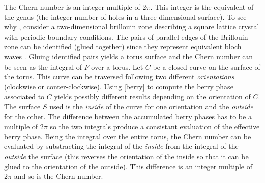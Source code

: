 The Chern number is an integer multiple of $2\pi$. This integer is the equivalent of the genus (the integer number of holes in a three-dimensional surface). To see why \cite{avron_topological_2003}, consider a two-dimensional brillouin zone describing a square lattice crystal with periodic boundary conditions. The pairs of parallel edges of the Brillouin zone can be identified (glued together) since they represent equivalent bloch waves . Gluing identified pairs yields a torus surface \cite{kane_topological_2013} and the Chern number can be seen as the integral of $F$ over a torus. Let $C$ be a closed curve on the surface of the torus. This curve can be traversed following two different \textit{orientations} (clockwise or conter-clockwise). Using \eqref{berry} to compute the berry phase associated to $C$ yields possibly different results depending on the orientation of $C$. The surface $S$ used is the \textit{inside} of the curve for one orientation and the \textit{outside} for the other. The difference between the accumulated berry phases has to be a multiple of $2\pi$ so the two integrals produce a consistant evaluation of the effective berry phase. Being the integral over the entire torus, the Chern number can be evaluated by substracting the integral of the \textit{inside} from the integral of the \textit{outside} the surface (this reverses the orientation of the inside so that it can be glued to the orientation of the outside). This difference is an integer multiple of $2\pi$ and so is the Chern number.


